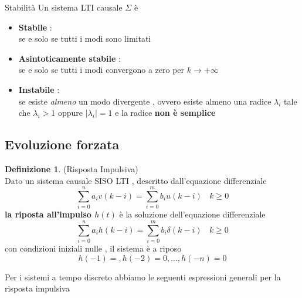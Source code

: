 \documentclass{article}
\theoremstyle{definition}
\newtheorem*{definizione}{Definizione}
\newcommand{\la}{\lambda}
\newcommand{\sisdiscro}{\sum_{i=0}^n a_iv(k-i)=\sum_{i=0}^m b_iu(k-i) \ \ \ \ k \geq 0}
\newcommand{\sisdiscrdo}{\sum_{i=0}^n a_ih(k-i)=\sum_{i=0}^m b_i\delta(k-i) \ \ \ \ k \geq 0}
\begin{document}
	\begin{teo}{Stabilità}
		Un sistema LTI causale $\Sigma$ è 
		\begin{itemize}
			\item \textbf{Stabile} : \\ se e solo se tutti i modi sono limitati 
			\item \textbf{Asintoticamente stabile }: \\se e solo se tutti i modi convergono a zero per $k \rightarrow + \infty $
			\item \textbf{Instabile} :\\ se esiste \textit{almeno} un modo divergente , ovvero esiste almeno una radice $\la_i $ tale che $\la_i >1 $ oppure $|\la_i|=1$ e la radice \textbf{non è semplice }
		\end{itemize} 
	\end{teo}
	\newpage
		\subsection{Evoluzione forzata}
		\begin{definizione}(Risposta Impulsiva)\\
		Dato un sistema causale SISO LTI , descritto dall'equazione differenziale 
		$$\sisdiscro$$
		 \textbf{la riposta all'impulso $h(t)$} è la soluzione dell'equazione differenziale   
		$$\sisdiscrdo$$
		con condizioni iniziali nulle , il sistema è a riposo 
		$$h(-1)= , h(-2)=0 , \dots , h(-n)=0
		$$ 
	\end{definizione}
Per i sistemi a tempo discreto abbiamo le seguenti espressioni generali per la risposta impulsiva
\end{document}

